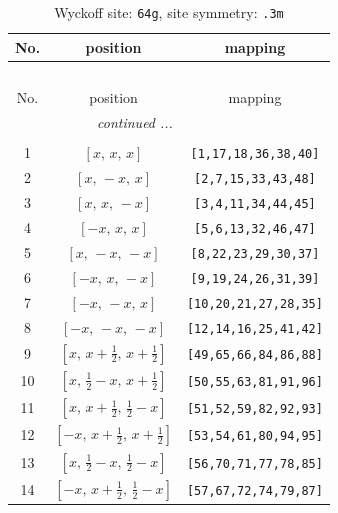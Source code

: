 \documentclass[fleqn,8pt]{jsarticle}
\begin{document}
\renewcommand{\arraystretch}{1.2}
\begin{longtable}{ccc}
\caption{Wyckoff site: {\tt 64g}, site symmetry: {\tt .3m}}
 \\
 \hline \hline
No. & position & mapping \\ \hline \endfirsthead

\multicolumn{2}{l}{\tablename\ \thetable{}} \\
 \hline \hline
No. & position & mapping \\ \hline \endhead

 \hline \hline
\multicolumn{2}{r}{\footnotesize\it continued ...} \\ \endfoot

 \hline \hline
\multicolumn{2}{r}{} \\ \endlastfoot

1 & $\left[ x,\, x,\, x \right]$ & {\tt [1,17,18,36,38,40]} \\ \hline
2 & $\left[ x,\, - x,\, x \right]$ & {\tt [2,7,15,33,43,48]} \\ \hline
3 & $\left[ x,\, x,\, - x \right]$ & {\tt [3,4,11,34,44,45]} \\ \hline
4 & $\left[ - x,\, x,\, x \right]$ & {\tt [5,6,13,32,46,47]} \\ \hline
5 & $\left[ x,\, - x,\, - x \right]$ & {\tt [8,22,23,29,30,37]} \\ \hline
6 & $\left[ - x,\, x,\, - x \right]$ & {\tt [9,19,24,26,31,39]} \\ \hline
7 & $\left[ - x,\, - x,\, x \right]$ & {\tt [10,20,21,27,28,35]} \\ \hline
8 & $\left[ - x,\, - x,\, - x \right]$ & {\tt [12,14,16,25,41,42]} \\ \hline
9 & $\left[ x,\, x + \frac{1}{2},\, x + \frac{1}{2} \right]$ & {\tt [49,65,66,84,86,88]} \\ \hline
10 & $\left[ x,\, \frac{1}{2} - x,\, x + \frac{1}{2} \right]$ & {\tt [50,55,63,81,91,96]} \\ \hline
11 & $\left[ x,\, x + \frac{1}{2},\, \frac{1}{2} - x \right]$ & {\tt [51,52,59,82,92,93]} \\ \hline
12 & $\left[ - x,\, x + \frac{1}{2},\, x + \frac{1}{2} \right]$ & {\tt [53,54,61,80,94,95]} \\ \hline
13 & $\left[ x,\, \frac{1}{2} - x,\, \frac{1}{2} - x \right]$ & {\tt [56,70,71,77,78,85]} \\ \hline
14 & $\left[ - x,\, x + \frac{1}{2},\, \frac{1}{2} - x \right]$ & {\tt [57,67,72,74,79,87]} \\ \hline

\end{longtable}
\end{document}
